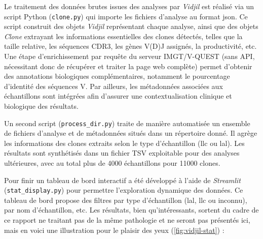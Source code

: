 \vspace{1em}

Le traitement des données brutes issues des analyses par \textit{Vidjil} est réalisé via un script Python (\texttt{clone.py}) qui importe les fichiers d'analyse au format \gls{json}. 
Ce script construit des objets \textit{Vidjil} représentant chaque analyse, ainsi que des objets \textit{Clone} extrayant les informations essentielles des clones détectés, 
telles que la taille relative, les séquences CDR3, les gènes V(D)J assignés, la productivité, etc. Une étape d'enrichissement par requête du serveur IMGT/V-QUEST 
(sans API, nécessitant donc de récupérer et traiter la page web complète) permet d'obtenir des annotations biologiques complémentaires, notamment le pourcentage d'identité des séquences V.
Par ailleurs, les métadonnées associées aux échantillons sont intégrées afin d'assurer une contextualisation clinique et biologique des résultats.

\vspace{1em}

Un second script (\texttt{process\_dir.py}) traite de manière automatisée un ensemble de fichiers d'analyse et de métadonnées situés dans un répertoire donné. 
Il agrège les informations des clones extraits selon le type d'échantillon (\gls{llc} ou \gls{lal}). Les résultats sont synthétisés dans un fichier TSV exploitable 
pour des analyses ultérieures, avec au total plus de 4000 échantillons pour 11000 clones.

\vspace{1em}

Pour finir un tableau de bord interactif a été développé à l'aide de \textit{Streamlit} (\texttt{stat\_display.py}) pour permettre l'exploration dynamique des données. 
Ce tableau de bord propose des filtres par type d'échantillon (\gls{lal}, \gls{llc} ou inconnu), par nom d'échantillon, etc. Les résultats, bien qu'intéressants, sortent du cadre 
de ce rapport ne traitant pas de la même pathologie et ne seront pas présentés ici, mais en voici une illustration pour le plaisir des yeux (\autoref{fig:vidjil-stat}) :

